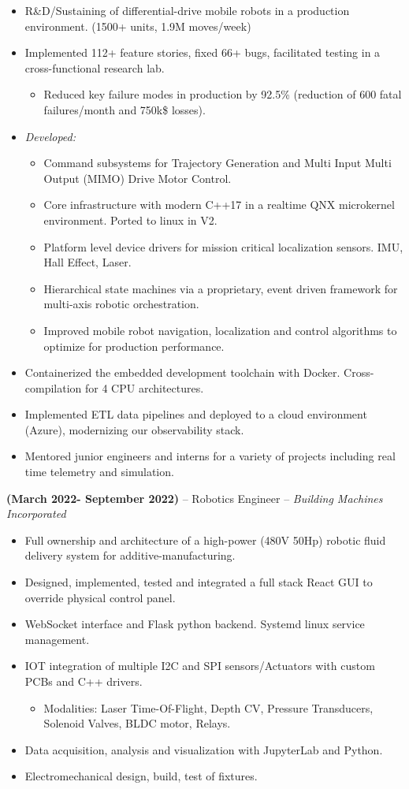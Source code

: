 \documentclass[11pt,a4paper]{article}
\newcommand{\jobentry}[2]{
  \vspace{0.5\baselineskip}\textbf{#1} -- #2 
}
\begin{document}
\begin{itemize}
\item R\&D/Sustaining of differential-drive mobile robots in a production environment. (1500+ units, 1.9M moves/week)
\item Implemented 112+ feature stories, fixed 66+ bugs, facilitated testing in a cross-functional research lab.
  \begin{itemize}
  \item Reduced key failure modes in production by 92.5\% (reduction of 600 fatal failures/month and 750k\$ losses).
  \end{itemize}
\item \textit{Developed:}
  \begin{itemize}
  \item Command subsystems for Trajectory Generation and Multi Input Multi Output (MIMO) Drive Motor Control.
  \item Core infrastructure with modern C++17 in a realtime QNX microkernel environment. Ported to linux in V2.
  \item Platform level device drivers for mission critical localization sensors. IMU, Hall Effect, Laser.
  \item Hierarchical state machines via a proprietary, event driven framework for multi-axis robotic orchestration.
  \item Improved mobile robot navigation, localization and control algorithms to optimize for production performance.
  \end{itemize}
\item Containerized the embedded development toolchain with Docker. Cross-compilation for 4 CPU architectures.
\item Implemented ETL data pipelines and deployed to a cloud environment (Azure), modernizing our observability stack.
\item Mentored junior engineers and interns for a variety of projects including real time telemetry and simulation.
\end{itemize}
\jobentry{(March 2022- September 2022)}{Robotics Engineer -- \textit{Building Machines Incorporated}}
\begin{itemize}
\item Full ownership and architecture of a high-power (480V 50Hp) robotic fluid delivery system for additive-manufacturing.
\item Designed, implemented, tested and integrated a full stack React GUI to override physical control panel.
\item WebSocket interface and Flask python backend. Systemd linux service management.
\item IOT integration of multiple I2C and SPI sensors/Actuators with custom PCBs and C++ drivers.
\begin{itemize}
\item Modalities: Laser Time-Of-Flight, Depth CV, Pressure Transducers, Solenoid Valves, BLDC motor, Relays.
\end{itemize}
\item Data acquisition, analysis and visualization with JupyterLab and Python.
\item Electromechanical design, build, test of fixtures.
\end{itemize}
\end{document}
